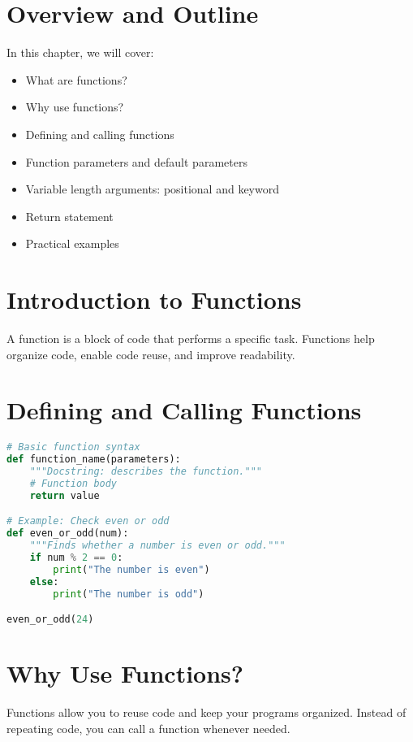 \section{Overview and Outline}

In this chapter, we will cover:
\begin{itemize}
    \item What are functions?
    \item Why use functions?
    \item Defining and calling functions
    \item Function parameters and default parameters
    \item Variable length arguments: positional and keyword
    \item Return statement
    \item Practical examples
\end{itemize}

\section{Introduction to Functions}

A function is a block of code that performs a specific task.  
Functions help organize code, enable code reuse, and improve readability.

\section{Defining and Calling Functions}

\begin{lstlisting}[language=Python]
# Basic function syntax
def function_name(parameters):
    """Docstring: describes the function."""
    # Function body
    return value

# Example: Check even or odd
def even_or_odd(num):
    """Finds whether a number is even or odd."""
    if num % 2 == 0:
        print("The number is even")
    else:
        print("The number is odd")

even_or_odd(24)
\end{lstlisting}

\section{Why Use Functions?}

Functions allow you to reuse code and keep your programs organized.  
Instead of repeating code, you can call a function whenever needed.

